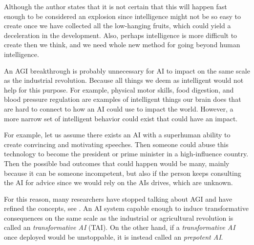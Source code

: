 \documentclass[12pt,A4]{report}
\theoremstyle{definition}
\begin{document}
Although the author states that it is not certain that this will happen fast enough to be considered an explosion since intelligence might not be so easy to create once we have collected all the low-hanging fruits, which could yield a deceleration in the development. Also, perhaps intelligence is more difficult to create then we think, and we need whole new method for going beyond human intelligence.

An AGI breakthrough is probably unnecessary for AI to impact on the same scale as the industrial revolution. Because all things we deem as intelligent would not help for this purpose. For example, physical motor skills, food digestion, and blood pressure regulation are examples of intelligent things our brain does that are hard to connect to how an AI could use to impact the world. However, a more narrow set of intelligent behavior could exist that could have an impact. 

For example, let us assume there exists an AI with a superhuman ability to create convincing and motivating speeches. Then someone could abuse this technology to become the president or prime minister in a high-influence country. Then the possible bad outcomes that could happen would be many, mainly because it can be someone incompetent, but also if the person keeps consulting the AI for advice since we would rely on the AIs drives, which are unknown. 

For this reason, many researchers have stopped talking about AGI and have refined the concepts, see \citet{CritchKruger}. An AI system capable enough to induce transformative consequences on the same scale as the industrial or agricultural revolution is called an \textit{transformative AI} (TAI). On the other hand, if a \textit{transformative AI} once deployed would be unstoppable, it is instead called an \textit{prepotent AI}. 
\end{document}

